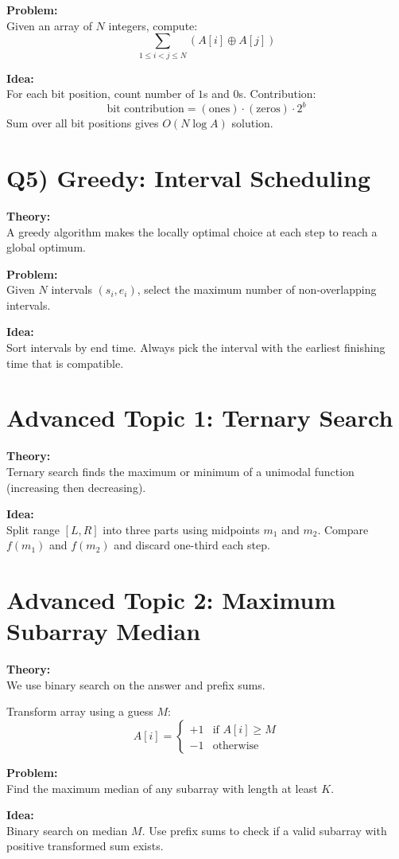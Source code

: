 \documentclass{article}
\begin{document}
\textbf{Problem:} \\
Given an array of $N$ integers, compute:
\[
\sum_{1 \le i < j \le N} (A[i] \oplus A[j])
\]

\textbf{Idea:} \\
For each bit position, count number of $1$s and $0$s. Contribution:
\[
\text{bit contribution} = (\text{ones}) \cdot (\text{zeros}) \cdot 2^b
\]
Sum over all bit positions gives $O(N \log A)$ solution.

\section*{Q5) Greedy: Interval Scheduling}

\textbf{Theory:} \\
A greedy algorithm makes the locally optimal choice at each step to reach a global optimum.

\textbf{Problem:} \\
Given $N$ intervals $(s_i, e_i)$, select the maximum number of non-overlapping intervals.

\textbf{Idea:} \\
Sort intervals by end time. Always pick the interval with the earliest finishing time that is compatible.

\section*{Advanced Topic 1: Ternary Search}

\textbf{Theory:} \\
Ternary search finds the maximum or minimum of a unimodal function (increasing then decreasing).

\textbf{Idea:} \\
Split range $[L,R]$ into three parts using midpoints $m_1$ and $m_2$. Compare $f(m_1)$ and $f(m_2)$ and discard one-third each step.

\section*{Advanced Topic 2: Maximum Subarray Median}

\textbf{Theory:} \\
We use binary search on the answer and prefix sums.

Transform array using a guess $M$:
\[
A[i] =
\begin{cases}
+1 & \text{if } A[i] \ge M \\
-1 & \text{otherwise}
\end{cases}
\]

\textbf{Problem:} \\
Find the maximum median of any subarray with length at least $K$.

\textbf{Idea:} \\
Binary search on median $M$. Use prefix sums to check if a valid subarray with positive transformed sum exists.
\end{document}
